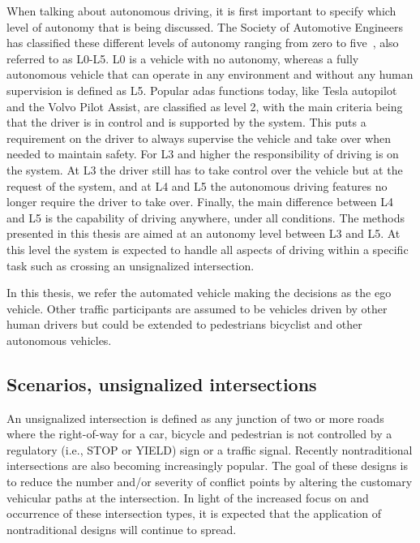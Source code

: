 When talking about autonomous driving, it is first important to specify which level of autonomy that is being discussed. The Society of Automotive Engineers has classified these different levels of autonomy ranging from zero to five~\cite{SAE2021}, also referred to as L0-L5. L0 is a vehicle with no autonomy, whereas a fully autonomous vehicle that can operate in any environment and without any human supervision is defined as L5. Popular \gls{adas} functions today, like Tesla autopilot and the Volvo Pilot Assist, are classified as level 2, with the main criteria being that the driver is in control and is supported by the system. This puts a requirement on the driver to always supervise the vehicle and take over when needed to maintain safety. For L3 and higher the responsibility of driving is on the system. At L3 the driver still has to take control over the vehicle but at the request of the system, and at L4 and L5 the autonomous driving features no longer require the driver to take over. Finally, the main difference between L4 and L5 is the capability of driving anywhere, under all conditions. 
The methods presented in this thesis are aimed at an autonomy level between L3 and L5. At this level the system is expected to handle all aspects of driving within a specific task such as crossing an unsignalized intersection. 

In this thesis, we refer the automated vehicle making the decisions as the ego vehicle.
Other traffic participants are assumed to be vehicles driven by other human drivers but could be extended to pedestrians bicyclist and other autonomous vehicles. 



\subsection{Scenarios, unsignalized intersections}
An unsignalized intersection is defined as any junction of two or more roads where the right-of-way for a car, bicycle and pedestrian is not controlled by a regulatory (i.e., STOP or YIELD) sign or a traffic signal.
Recently nontraditional intersections are also becoming increasingly popular. The goal of these designs is to reduce the number and/or severity of conflict points by altering the customary vehicular paths at the intersection. In light of the increased focus on and occurrence of these intersection types, it is expected that the application of nontraditional designs will continue to spread.

